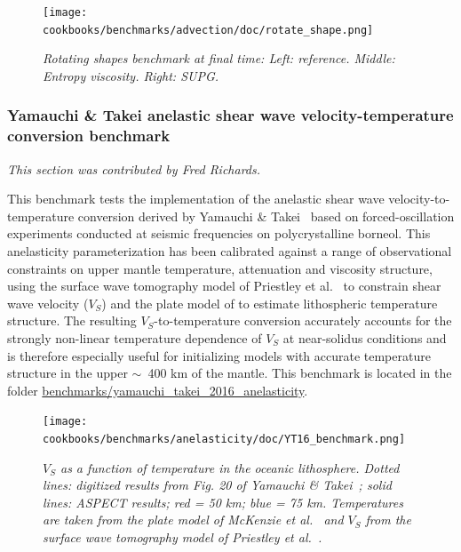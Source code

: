 \documentclass{article}
\newcommand{\aspect}{\textsc{ASPECT}}
\begin{document}
\begin{figure}[t!]
  \centering
    \texttt{[image: cookbooks/benchmarks/advection/doc/rotate\_shape.png]}%
  \caption{\it Rotating shapes benchmark at final time: Left: reference. Middle: Entropy viscosity. Right: SUPG.}\label{fig:benchmark-rotate-shape}
\end{figure}


\subsubsection{Yamauchi \& Takei anelastic shear wave velocity-temperature conversion benchmark}
\label{sec:benchmark-yamauchi-takei}

\textit{This section was contributed by Fred Richards.}

This benchmark tests the implementation of the anelastic shear wave velocity-to-temperature conversion derived by Yamauchi \& Takei~\cite{YT16} based on forced-oscillation experiments conducted at seismic frequencies on polycrystalline borneol. This anelasticity parameterization has been calibrated against a range of observational constraints on upper mantle temperature, attenuation and viscosity structure, using the surface wave tomography model of Priestley et al.~\cite{P12} to constrain shear wave velocity ($V_S$) and the plate model of \cite{McK05} to estimate lithospheric temperature structure. The resulting $V_S$-to-temperature conversion accurately accounts for the strongly non-linear temperature dependence of $V_S$ at near-solidus conditions and is therefore especially useful for initializing models with accurate temperature structure in the upper $\sim$~400 km of the mantle. This benchmark is located in the folder \url{benchmarks/yamauchi_takei_2016_anelasticity}.

\begin{figure}
\begin{center}
  \centering
  \texttt{[image: cookbooks/benchmarks/anelasticity/doc/YT16\_benchmark.png]}
  \caption{\it $V_S$ as a function of temperature in the oceanic lithosphere. Dotted lines: digitized results from Fig. 20 of Yamauchi \& Takei~\cite{YT16}; solid lines: \aspect{} results; red = 50 km; blue = 75 km. Temperatures are taken from the plate model of McKenzie et al.~\cite{McK05} and $V_{S}$ from the surface wave tomography model of Priestley et al.~\cite{P12}.}
  \label{fig:anelasticity}
\end{center}
\end{figure}
\end{document}
